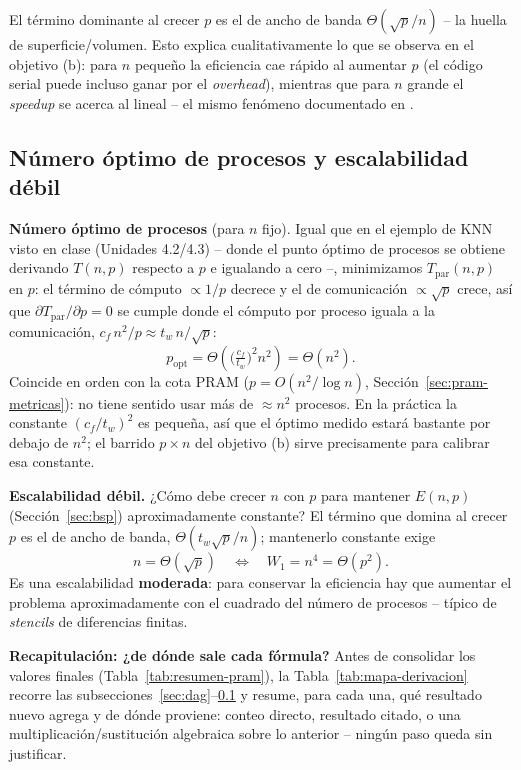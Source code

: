 \documentclass[11pt,a4paper]{article}
\begin{document}
	El término dominante al crecer $p$ es el de ancho de banda $\Theta(\sqrt p/n)$ --
	la huella de superficie/volumen. Esto explica cualitativamente lo que se observa
	en el objetivo (b): para $n$ pequeño la eficiencia cae rápido al aumentar $p$ (el
	código serial puede incluso ganar por el \textit{overhead}), mientras que para
	$n$ grande el \textit{speedup} se acerca al lineal -- el mismo fenómeno
	documentado en \cite{nmsu-hpc, lammps}.

	\subsection{Número óptimo de procesos y escalabilidad débil}
	\label{sec:isoeficiencia}
	\enlargethispage{3 \baselineskip}

	\textbf{Número óptimo de procesos} (para $n$ fijo). Igual que en el ejemplo de
	KNN visto en clase (Unidades 4.2/4.3) -- donde el punto óptimo de procesos se
	obtiene derivando $T(n,p)$ respecto a $p$ e igualando a cero --, minimizamos
	$T_{\text{par}}(n,p)$ en $p$: el término de cómputo $\propto1/p$ decrece y el de
	comunicación $\propto\sqrt p$ crece, así que $\partial T_{\text{par}}/\partial
	p=0$ se cumple donde el cómputo por proceso iguala a la comunicación,
	$c_f\,n^2/p\approx t_w\,n/\sqrt p$:
	\[
	\boxed{p_{\text{opt}}=\Theta\!\left(\Big(\tfrac{c_f}{t_w}\Big)^2 n^2\right)=\Theta(n^2).}
	\]
	Coincide en orden con la cota PRAM ($p=O(n^2/\log n)$, Sección~\ref{sec:pram-metricas}):
	no tiene sentido usar más de $\approx n^2$ procesos. En la práctica la constante
	$(c_f/t_w)^2$ es pequeña, así que el óptimo medido estará bastante por debajo de
	$n^2$; el barrido $p\times n$ del objetivo (b) sirve precisamente para calibrar
	esa constante.

	\textbf{Escalabilidad débil.} ¿Cómo debe crecer $n$ con $p$ para mantener
	$E(n,p)$ (Sección~\ref{sec:bsp}) aproximadamente constante? El término que
	domina al crecer $p$ es el de ancho de banda, $\Theta(t_w\sqrt p/n)$;
	mantenerlo constante exige
	\[
	\boxed{n=\Theta(\sqrt p) \quad\Longleftrightarrow\quad W_1=n^4=\Theta(p^2).}
	\]
	Es una escalabilidad \textbf{moderada}: para conservar la eficiencia hay que
	aumentar el problema aproximadamente con el cuadrado del número de procesos --
	típico de \textit{stencils} de diferencias finitas.
	
	\vspace{0.5cm}
	\textbf{Recapitulación: ¿de dónde sale cada fórmula?} Antes de consolidar los
	valores finales (Tabla~\ref{tab:resumen-pram}), la Tabla~\ref{tab:mapa-derivacion}
	recorre las subsecciones~\ref{sec:dag}--\ref{sec:isoeficiencia} y resume, para
	cada una, qué resultado nuevo agrega y de dónde proviene: conteo directo,
	resultado citado, o una multiplicación/sustitución algebraica sobre lo
	anterior -- ningún paso queda sin justificar.
\end{document}
